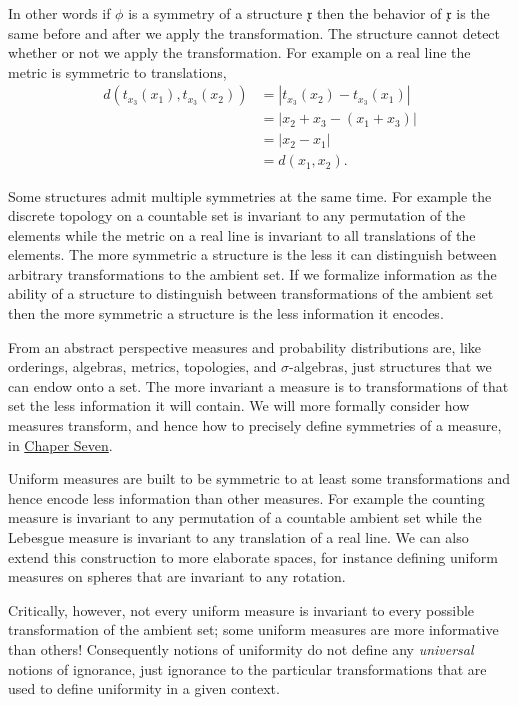 \documentclass[
  letterpaper,
  DIV=11,
  numbers=noendperiod]{scrartcl}
\begin{document}
In other words if \(\phi\) is a symmetry of a structure \(\mathfrak{x}\)
then the behavior of \(\mathfrak{x}\) is the same before and after we
apply the transformation. The structure cannot detect whether or not we
apply the transformation. For example on a real line the metric is
symmetric to translations, \begin{align*}
d( t_{x_{3}}(x_{1}), t_{x_{3}}(x_{2}) )
&=
| t_{x_{3}}(x_{2}) - t_{x_{3}}(x_{1}) |
\\
&=
| x_{2} + x_{3} - (x_{1} + x_{3}) |
\\
&=
| x_{2} - x_{1} |
\\
&=
d(x_{1}, x_{2}).
\end{align*}

Some structures admit multiple symmetries at the same time. For example
the discrete topology on a countable set is invariant to any permutation
of the elements while the metric on a real line is invariant to all
translations of the elements. The more symmetric a structure is the less
it can distinguish between arbitrary transformations to the ambient set.
If we formalize information as the ability of a structure to distinguish
between transformations of the ambient set then the more symmetric a
structure is the less information it encodes.

From an abstract perspective measures and probability distributions are,
like orderings, algebras, metrics, topologies, and \(\sigma\)-algebras,
just structures that we can endow onto a set. The more invariant a
measure is to transformations of that set the less information it will
contain. We will more formally consider how measures transform, and
hence how to precisely define symmetries of a measure, in
\href{https://betanalpha.github.io/assets/chapters_html/transforming_probability_spaces.html}{Chaper
Seven}.

Uniform measures are built to be symmetric to at least some
transformations and hence encode less information than other measures.
For example the counting measure is invariant to any permutation of a
countable ambient set while the Lebesgue measure is invariant to any
translation of a real line. We can also extend this construction to more
elaborate spaces, for instance defining uniform measures on spheres that
are invariant to any rotation.

Critically, however, not every uniform measure is invariant to every
possible transformation of the ambient set; some uniform measures are
more informative than others! Consequently notions of uniformity do not
define any \emph{universal} notions of ignorance, just ignorance to the
particular transformations that are used to define uniformity in a given
context.
\end{document}
